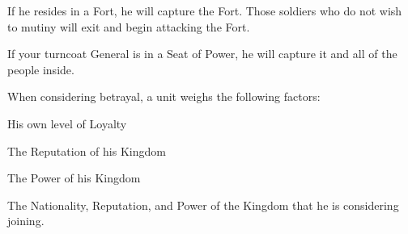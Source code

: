 If he resides in a Fort, he will capture the Fort. Those soldiers who do not wish to mutiny will exit and begin attacking the Fort.

If your turncoat General is in a Seat of Power, he will capture it and all of the people inside.

When considering betrayal, a unit weighs the following factors:

\begin{changemargin}{.5cm}{0cm}
His own level of Loyalty

The Reputation of his Kingdom

The Power of his Kingdom

The Nationality, Reputation, and Power of the Kingdom that he is considering joining.
\end{changemargin}